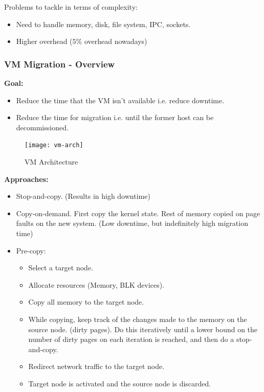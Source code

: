 \documentclass[parskip=half]{scrartcl}
\begin{document}
        Problems to tackle in terms of complexity:
        \begin{itemize}
            \item Need to handle memory, disk, file system, IPC, sockets.
            \item Higher overhead ($5\%$ overhead nowadays)
        \end{itemize}


    \subsubsection{VM Migration - Overview} %
    \label{ssub:vm_migrationn_overview}

        \textbf{Goal:}
        \begin{itemize}
            \item Reduce the time that the VM isn't available i.e. reduce downtime.
            \item Reduce the time for migration i.e. until the former host can be decommissioned.
        \end{itemize}

        \begin{figure}[th]
            \centering
            \texttt{[image: vm-arch]}
            \caption{VM Architecture}
            \label{fig:vm-arch}
        \end{figure}

        \textbf{Approaches:}
        \begin{itemize}
            \item Stop-and-copy. (Results in high downtime)
            \item Copy-on-demand. First copy the kernel state. Rest of memory copied on page faults on the new system. (Low downtime, but indefinitely high migration time)
            \item Pre-copy:
            \begin{itemize}
                \item Select a target node.
                \item Allocate resources (Memory, BLK devices).
                \item Copy all memory to the target node.
                \item While copying, keep track of the changes made to the memory on the source node. (dirty pages). Do this iteratively until a lower bound on the number of dirty pages on each iteration is reached, and then do a stop-and-copy.
                \item Redirect network traffic to the target node.
                \item Target node is activated and the source node is discarded.
            \end{itemize}
        \end{itemize}
\end{document}
